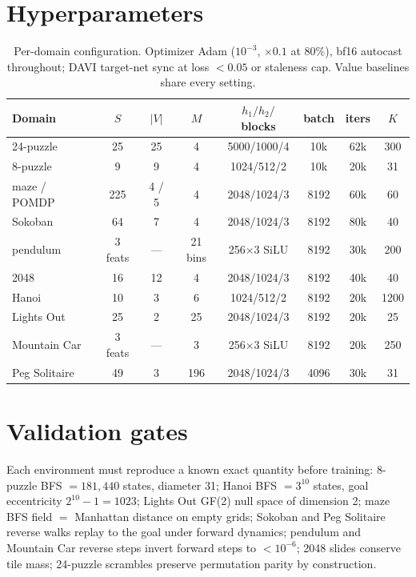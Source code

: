 \documentclass[11pt]{article}
\begin{document}
\appendix

\section{Hyperparameters}
\begin{table}[h]
\centering
\scriptsize
\begin{tabular}{lccccccc}
\toprule
Domain & $S$ & $|V|$ & $M$ & $h_1/h_2/$blocks & batch & iters & $K$ \\
\midrule
24-puzzle & 25 & 25 & 4 & 5000/1000/4 & 10k & 62k & 300 \\
8-puzzle & 9 & 9 & 4 & 1024/512/2 & 10k & 20k & 31 \\
maze / POMDP & 225 & 4 / 5 & 4 & 2048/1024/3 & 8192 & 60k & 60 \\
Sokoban & 64 & 7 & 4 & 2048/1024/3 & 8192 & 80k & 40 \\
pendulum & 3 feats & --- & 21 bins & 256$\times$3 SiLU & 8192 & 30k & 200 \\
2048 & 16 & 12 & 4 & 2048/1024/3 & 8192 & 40k & 40 \\
Hanoi & 10 & 3 & 6 & 1024/512/2 & 8192 & 20k & 1200 \\
Lights Out & 25 & 2 & 25 & 2048/1024/3 & 8192 & 20k & 25 \\
Mountain Car & 3 feats & --- & 3 & 256$\times$3 SiLU & 8192 & 20k & 250 \\
Peg Solitaire & 49 & 3 & 196 & 2048/1024/3 & 4096 & 30k & 31 \\
\bottomrule
\end{tabular}
\caption{Per-domain configuration. Optimizer Adam ($10^{-3}$, $\times0.1$ at
$80\%$), bf16 autocast throughout; DAVI target-net sync at loss $<0.05$ or
staleness cap. Value baselines share every setting.}
\end{table}

\section{Validation gates}
Each environment must reproduce a known exact quantity before training:
8-puzzle BFS $= 181{,}440$ states, diameter 31; Hanoi BFS $= 3^{10}$ states,
goal eccentricity $2^{10}{-}1 = 1023$; Lights Out GF(2) null space of
dimension 2; maze BFS field $=$ Manhattan distance on empty grids; Sokoban
and Peg Solitaire reverse walks replay to the goal under forward dynamics;
pendulum and Mountain Car reverse steps invert forward steps to
${<}10^{-6}$; 2048 slides conserve tile mass; 24-puzzle scrambles preserve
permutation parity by construction.
\end{document}
